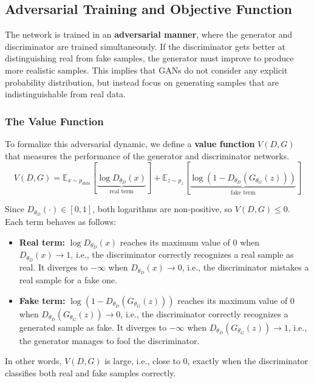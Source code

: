 \subsection{Adversarial Training and Objective Function}
The network is trained in an \textbf{adversarial manner}, where the generator and discriminator are trained simultaneously.
If the discriminator gets better at distinguishing real from fake samples, the generator must improve to produce more realistic samples.
This implies that GANs do not consider any explicit probability distribution, but instead focus on generating samples that are indistinguishable from real data.

\subsubsection{The Value Function}
To formalize this adversarial dynamic, we define a \textbf{value function} $V(D, G)$ that measures the performance of the generator and discriminator networks.
\begin{equation}
    \label{eq:gan-value-function}
    V(D, G) = \mathbb{E}_{x \sim p_{data}}[\underbrace{\log D_{\theta_D}(x)}_{\text{real term}}] + \mathbb{E}_{z \sim p_{z}}[\underbrace{\log(1 - D_{\theta_D}(G_{\theta_G}(z)))}_{\text{fake term}}]
\end{equation}

Since $D_{\theta_D}(\cdot) \in [0,1]$, both logarithms are non-positive, so $V(D,G) \leq 0$. Each term behaves as follows:
\begin{itemize}
    \item \textbf{Real term:} $\log D_{\theta_D}(x)$ reaches its maximum value of $0$ when $D_{\theta_D}(x) \rightarrow 1$, i.e., the discriminator correctly recognizes a real sample as real. It diverges to $-\infty$ when $D_{\theta_D}(x) \rightarrow 0$, i.e., the discriminator mistakes a real sample for a fake one.
    \item \textbf{Fake term:} $\log(1 - D_{\theta_D}(G_{\theta_G}(z)))$ reaches its maximum value of $0$ when $D_{\theta_D}(G_{\theta_G}(z)) \rightarrow 0$, i.e., the discriminator correctly recognizes a generated sample as fake. It diverges to $-\infty$ when $D_{\theta_D}(G_{\theta_G}(z)) \rightarrow 1$, i.e., the generator manages to fool the discriminator.
\end{itemize}

In other words, $V(D,G)$ is large, i.e., close to $0$, exactly when the discriminator classifies both real and fake samples correctly.

